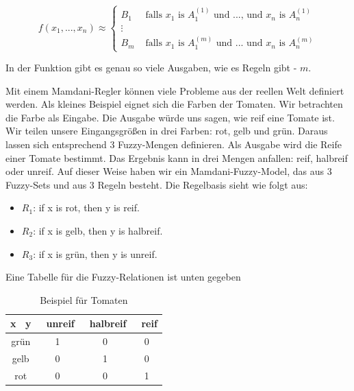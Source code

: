\begin{equation}
	f(x_1, ..., x_n) \approx 
	\left\{
		\begin{array}{ll}
			B_1 & \mbox{ falls } x_1 \mbox{ is } A_1^{(1)} \mbox{ und ..., und } x_{n} \mbox{ is } A_n^{(1)}\\
			\vdots \\
			B_{m} & \mbox{ falls } x_1 \mbox{ is } A_1^{(m)} \mbox{ und ... und } x_{n} \mbox{ is } A_n^{(m)}
		\end{array}
	\right.
\end{equation}

In der Funktion gibt es genau so viele Ausgaben, wie es Regeln gibt - $m$.

Mit einem Mamdani-Regler können viele Probleme aus der reellen Welt definiert werden. Als kleines Beispiel eignet sich die Farben der Tomaten. Wir betrachten die Farbe als Eingabe. Die Ausgabe würde uns sagen, wie reif eine Tomate ist. Wir teilen unsere Eingangsgrößen in drei Farben: rot, gelb und grün. Daraus lassen sich entsprechend 3 Fuzzy-Mengen definieren. Als Ausgabe wird die Reife einer Tomate bestimmt. Das Ergebnis kann in drei Mengen anfallen: reif, halbreif oder unreif. Auf dieser Weise haben wir ein Mamdani-Fuzzy-Model, das aus 3 Fuzzy-Sets und aus 3 Regeln besteht. Die Regelbasis sieht wie folgt aus:

\begin{itemize}
	\item $R_1$: if x is rot, then y is reif.
	\item $R_2$: if x is gelb, then y is halbreif.
	\item $R_3$: if x is grün, then y is unreif.
\end{itemize}

Eine Tabelle für die Fuzzy-Relationen ist unten gegeben

\begin{table}\label{tomato:1}
	\centering
	\begin{tabular}{c|c c c}
		
		x \diagdown \ y & \ unreif & \ halbreif & \ reif \\ [0.5ex]
		\hline
		grün & 1 & 0 & 0 \\ 
		gelb & 0 & 1 & 0\\
		rot  & 0 & 0 & 1\\
		
	\end{tabular}
\caption{Beispiel für Tomaten}

\end{table}

